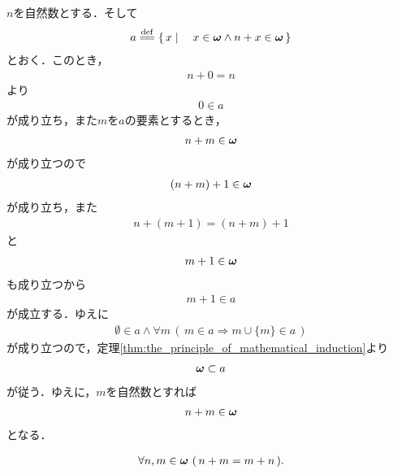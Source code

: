 	\begin{sketch}
		$n$を自然数とする．そして
		\begin{align}
			a \defeq \Set{x}{x \in \Natural \wedge n + x \in \Natural}
		\end{align}
		とおく．このとき，
		\begin{align}
			n + 0 = n
		\end{align}
		より
		\begin{align}
			0 \in a
		\end{align}
		が成り立ち，また$m$を$a$の要素とするとき，
		\begin{align}
			n + m \in {\boldsymbol \omega}
		\end{align}
		が成り立つので
		\begin{align}
			(n + m) + 1 \in {\boldsymbol \omega}
		\end{align}
		が成り立ち，また
		\begin{align}
			n + (m + 1) = (n + m) + 1
		\end{align}
		と
		\begin{align}
			m + 1 \in {\boldsymbol \omega}
		\end{align}
		も成り立つから
		\begin{align}
			m + 1 \in a
		\end{align}
		が成立する．ゆえに
		\begin{align}
			\emptyset \in a \wedge \forall m\, \left(\, m \in a \Longrightarrow m \cup \{m\} \in a\, \right)
		\end{align}
		が成り立つので，定理\ref{thm:the_principle_of_mathematical_induction}より
		\begin{align}
			{\boldsymbol \omega} \subset a
		\end{align}
		が従う．ゆえに，$m$を自然数とすれば
		\begin{align}
			n + m \in {\boldsymbol \omega}
		\end{align}
		となる．
		\QED
	\end{sketch}
	
	\begin{screen}
		\begin{thm}[自然数の和は可換]
			\begin{align}
				\forall n,m \in {\boldsymbol \omega}\ (\, n + m = m + n\, ).
			\end{align}
		\end{thm}
	\end{screen}


